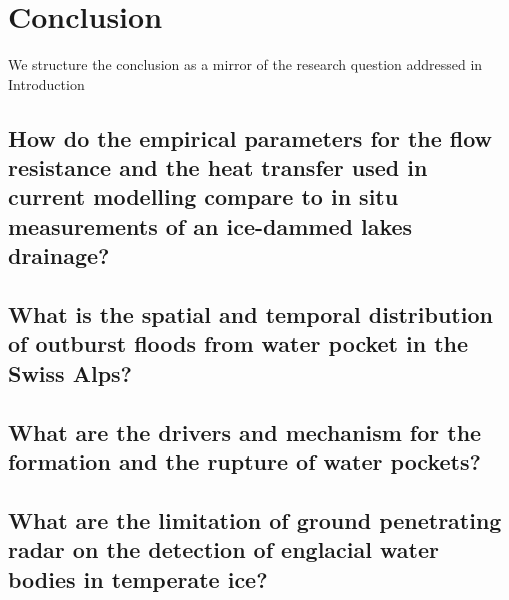 \chapter{Conclusion}
\label{ch:summary}

We structure the conclusion as a mirror of the research question addressed in Introduction


\section{How do the empirical parameters for the flow resistance and the heat transfer used in current modelling compare to in situ measurements of an ice-dammed lakes drainage?}


\section{What is the spatial and temporal distribution of outburst floods from water pocket in the Swiss Alps?}

\section{What are the drivers and mechanism for the formation and the rupture of water pockets?}

\section{What are the limitation of ground penetrating radar on the detection of englacial water bodies in temperate ice?}

